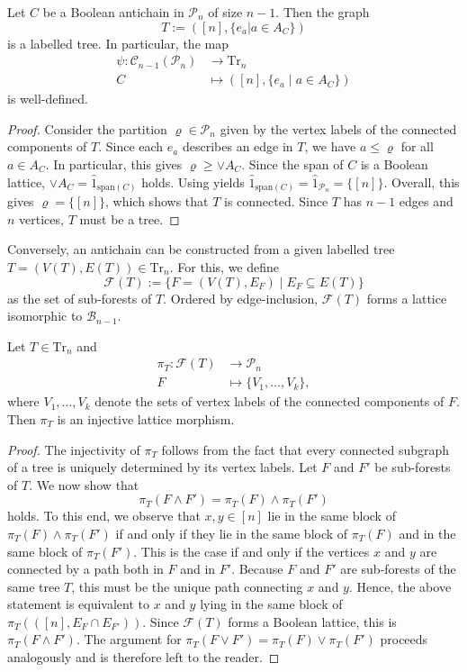 \documentclass{preprint}
\newcommand{\im}{\operatorname{im}}
\newcommand{\cB}{\mathcal{B}}
\newcommand{\cC}{\mathcal{C}}
\newcommand{\cF}{\mathcal{F}}
\newcommand{\cP}{\mathcal{P}}
\theoremstyle{definition}
\begin{document}
\begin{lemma}\label{lem: psi}
Let $C$ be a Boolean antichain in $\cP_n$ of size $n-1$. Then the graph \[T := ([n], \{e_a | a\in A_C\})\] is a labelled tree.
In particular, the map
\begin{align*}
    \psi:\cC_{n-1}(\cP_n)&\rightarrow \mathrm{Tr}_n\\
    C &\mapsto ([n],\{e_a \; | \; a \in A_C\})
\end{align*}
is well-defined.
\end{lemma}

\begin{proof}
Consider the partition $\varrho \in \cP_n$ given by the vertex labels of the connected components of $T$. Since each $e_a$ describes an edge in $T$, we have $a \leq \varrho$ for all $a\in A_C$. In particular, this gives $\varrho \geq \vee A_C$. Since the span of $C$ is a Boolean lattice, $\vee A_C = \hat{1}_{\text{span}(C)}$ holds. Using  yields $\hat{1}_{\text{span}(C)}=\hat{1}_{\cP_n}=\{[n]\}$. Overall, this gives $\varrho=\{[n]\}$, which shows that $T$ is connected. Since $T$ has $n-1$ edges and $n$ vertices, $T$ must be a tree.
\end{proof}

Conversely, an antichain can be constructed from a given labelled tree $T=(V(T),E(T))\in \mathrm{Tr}_n$. For this, we define
$$
    \cF(T):=\{F=(V(T),E_F)\; | \; E_F\subseteq E(T)\}
$$
as the set of sub-forests of $T$. Ordered by edge-inclusion, $\cF(T)$ forms a lattice isomorphic to $\cB_{n-1}$.


\begin{lemma}\label{lem: pi properties}
    Let $T \in \mathrm{Tr}_n$ and \begin{align*}
    \pi_T:\cF(T)&\rightarrow \cP_n\\
    F &\mapsto \{V_1,\dots,V_k\},
    \end{align*}
    where $V_1,\dots,V_k$ denote the sets of vertex labels of the connected components of $F$. Then $\pi_T$ is an injective lattice morphism.%
\end{lemma}
\begin{proof}
    The injectivity of $\pi_T$ follows from the fact that every connected subgraph of a tree is uniquely determined by its vertex labels. Let $F$ and $F'$ be sub-forests of $T$. We now show that
    $$
    \pi_T(F\wedge F') = \pi_T(F)\wedge \pi_T(F')
    $$
    holds. To this end, we observe that $x, y\in [n]$ lie in the same block of $\pi_T(F)\wedge \pi_T(F')$ if and only if they lie in the same block of $\pi_T(F)$ and in the same block of $\pi_T(F')$. This is the case if and only if the vertices $x$ and $y$ are connected by a path both in $F$ and in $F'$. Because $F$ and $F'$ are sub-forests of the same tree $T$, this must be the unique path connecting $x$ and $y$. Hence, the above statement is equivalent to $x$ and $y$ lying in the same block of $\pi_T(([n],E_F\cap E_{F'}))$. Since $\cF(T)$ forms a Boolean lattice, this is $\pi_T(F\wedge F')$. The argument for $\pi_T(F\vee F') = \pi_T(F)\vee \pi_T(F')$ proceeds analogously and is therefore left to the reader.
\end{proof}
\end{document}
